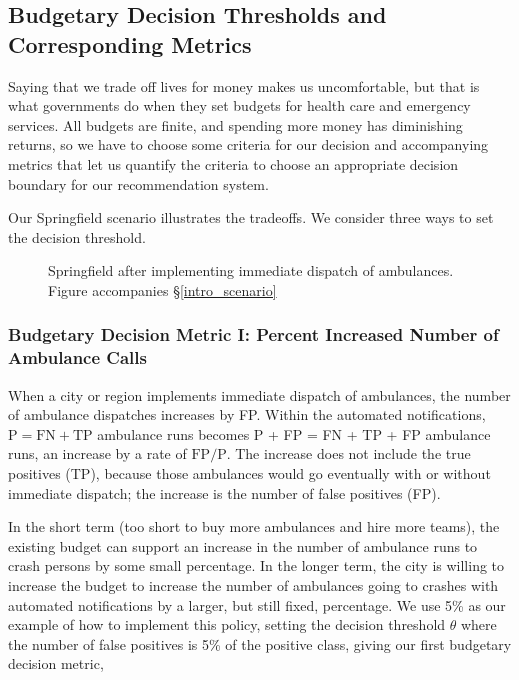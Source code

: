 \subsection{Budgetary Decision Thresholds and Corresponding Metrics}
\label{political_decisions}

Saying that we trade off lives for money makes us uncomfortable, but that is what governments do when they set budgets for health care and emergency services.  All budgets are finite, and spending more money has diminishing returns, so we have to choose some criteria for our decision and accompanying metrics that let us quantify the criteria to choose an appropriate decision boundary for our recommendation system.  

Our Springfield scenario illustrates the tradeoffs.  We consider three ways to set the decision threshold.  

\begin{figure}[h]
	
\caption{\normalfont\normalsize Springfield after implementing immediate dispatch of ambulances.  Figure accompanies \S\ref{intro_scenario}}
\label{methods_springfield_after}
\end{figure}

\FloatBarrier




\subsubsection{Budgetary Decision Metric I:  Percent Increased Number of Ambulance Calls}
\label{political_decisions_percent_increased}

When a city or region implements immediate dispatch of ambulances, the number of ambulance dispatches increases by FP.   Within the automated notifications, 
$\text{P} = \text{FN} + \text{TP}$
 ambulance runs becomes P + FP = FN + TP + FP ambulance runs, an increase by a rate of $\text{FP}/\text{P}$.  The increase does not include the true positives (TP), because those ambulances would go eventually with or without immediate dispatch; the increase is the number of false positives (FP).  
 
In the short term (too short to buy more ambulances and hire more teams), the existing budget can support an increase in the number of ambulance runs to crash persons by some small percentage.  In the longer term, the city is willing to increase the budget to increase the number of ambulances going to crashes with automated notifications by a larger, but still fixed, percentage.  We use 5\% as our example of how to implement this policy, setting the decision threshold $\theta$ where the number of false positives is 5\% of the positive class, giving our first budgetary decision metric,

